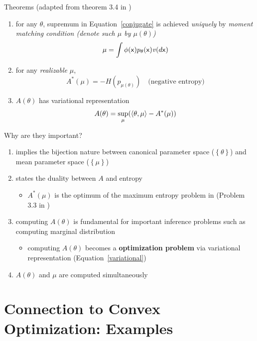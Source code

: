 \documentclass[t]{beamer}
\newcommand{\vx}{\ensuremath{\mathsf{x}}}
\newcommand{\vparam}{\ensuremath{\theta}}
\newcommand{\vmean}{\ensuremath{\mu}}
\newcommand{\vsuff}{\ensuremath{\phi}}
\newcommand{\set}[1]{\ensuremath{\left\{ #1 \right\}}}
\begin{document}
\begin{frame}{Theorems (adapted from theorem 3.4 in \cite{main})}
\begin{enumerate}
	\item {for any $\vparam$, supremum in Equation~\ref{conjugate} is achieved \textit{uniquely} by \textit{moment matching condition (denote such $\mu$ by $\mu(\theta)$)} 
	\[\mu = \int  \vsuff(\vx) \pp(\vx) \measure(d \vx)\]}
	\item {for any \textit{realizable} $\vmean$, 
	\[A^{*}(\vmean) = -H(p_{\mu(\theta)}) \quad \text{(negative entropy)}\]
	}
	\item {$A(\vparam)$ has variational representation
	\begin{equation}
		\label{variational}
		A(\vparam) = \sup_{\vmean} (\innerprod{\vparam, \vmean} - A^{*}(\vmean))
	\end{equation}
	}
\end{enumerate}
\end{frame}

\begin{frame}{Why are they important?}
	\begin{enumerate}
		\item implies the bijection nature between canonical parameter space ($\set{\theta}$) and mean parameter space ($\set{\mu}$)
		\item {states the duality between $A$ and entropy 
			\begin{itemize}
				\item $A^{*}(\mu)$ is the optimum of the maximum entropy problem in (Problem 3.3 in \cite{main})
			\end{itemize}
		}
		\item {computing $A(\vparam)$ is fundamental for important inference problems such as computing marginal distribution
			\begin{itemize}
				\item computing $A(\vparam)$ becomes a \textbf{optimization problem} via variational representation (Equation~\ref{variational})
			\end{itemize}
		}
		\item {$A(\theta)$ and $\mu$ are computed simultaneously}		
	\end{enumerate}
\end{frame}

\section{Connection to Convex Optimization: Examples}
\end{document}

